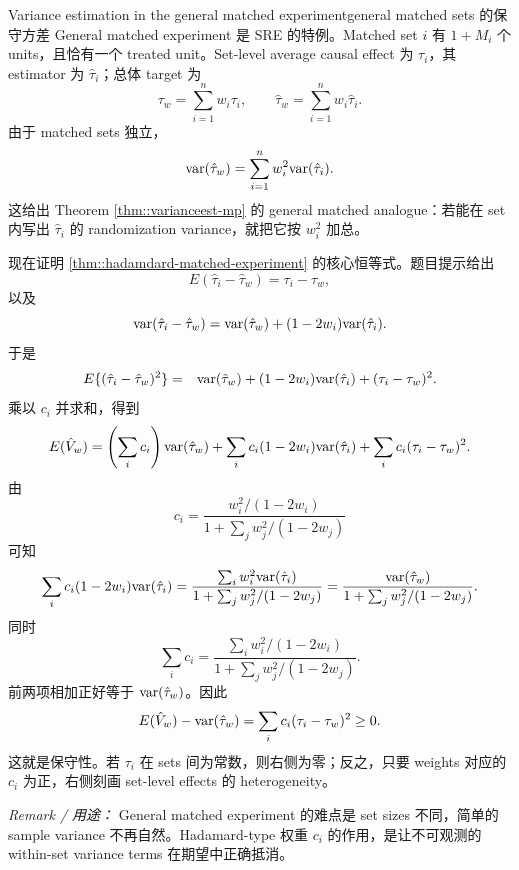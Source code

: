\begin{exercisesolution}{Variance estimation in the general matched experiment}{general matched sets 的保守方差}
General matched experiment 是 SRE 的特例。Matched set $i$ 有 $1+M_i$ 个 units，且恰有一个 treated unit。Set-level average causal effect 为 $\tau_i$，其 estimator 为 $\hat\tau_i$；总体 target 为
\[
\tau_w=\sum_{i=1}^n w_i\tau_i,
\qquad
\hat\tau_w=\sum_{i=1}^n w_i\hat\tau_i.
\]
由于 matched sets 独立，
\[
\textup{var}(\hat\tau_w)=\sum_{i=1}^n w_i^2\textup{var}(\hat\tau_i).
\]
这给出 Theorem \ref{thm::varianceest-mp} 的 general matched analogue：若能在 set 内写出 $\hat\tau_i$ 的 randomization variance，就把它按 $w_i^2$ 加总。

现在证明 \cref{thm::hadamdard-matched-experiment} 的核心恒等式。题目提示给出
\[
E(\hat\tau_i-\hat\tau_w)=\tau_i-\tau_w,
\]
以及
\[
\textup{var}(\hat\tau_i-\hat\tau_w)
=\textup{var}(\hat\tau_w)+(1-2w_i)\textup{var}(\hat\tau_i).
\]
于是
\begin{eqnarray*}
E\{(\hat\tau_i-\hat\tau_w)^2\}
&=&\textup{var}(\hat\tau_w)+(1-2w_i)\textup{var}(\hat\tau_i)
+(\tau_i-\tau_w)^2.
\end{eqnarray*}
乘以 $c_i$ 并求和，得到
\[
E(\hat V_w)
=\left(\sum_i c_i\right)\textup{var}(\hat\tau_w)
+\sum_i c_i(1-2w_i)\textup{var}(\hat\tau_i)
+\sum_i c_i(\tau_i-\tau_w)^2.
\]
由
\[
c_i=\frac{w_i^2/(1-2w_i)}
{1+\sum_j w_j^2/(1-2w_j)}
\]
可知
\[
\sum_i c_i(1-2w_i)\textup{var}(\hat\tau_i)
=\frac{\sum_i w_i^2\textup{var}(\hat\tau_i)}
{1+\sum_j w_j^2/(1-2w_j)}
=\frac{\textup{var}(\hat\tau_w)}
{1+\sum_j w_j^2/(1-2w_j)}.
\]
同时
\[
\sum_i c_i=
\frac{\sum_i w_i^2/(1-2w_i)}
{1+\sum_j w_j^2/(1-2w_j)}.
\]
前两项相加正好等于 $\textup{var}(\hat\tau_w)$。因此
\[
E(\hat V_w)-\textup{var}(\hat\tau_w)
=\sum_i c_i(\tau_i-\tau_w)^2\geq0.
\]
这就是保守性。若 $\tau_i$ 在 sets 间为常数，则右侧为零；反之，只要 weights 对应的 $c_i$ 为正，右侧刻画 set-level effects 的 heterogeneity。

\emph{Remark / 用途：} General matched experiment 的难点是 set sizes 不同，简单的 sample variance 不再自然。Hadamard-type 权重 $c_i$ 的作用，是让不可观测的 within-set variance terms 在期望中正确抵消。
\end{exercisesolution}
